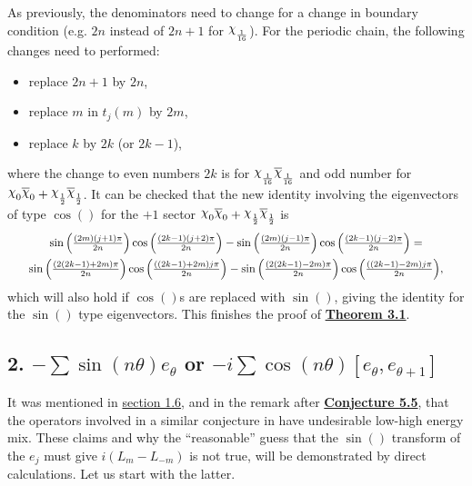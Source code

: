 \documentclass[twoside,11pt,titlepage]{amsart}
\renewcommand{\=}[1]{\stackrel{#1}{=}} %
\theoremstyle{definition}
\theoremstyle{remark}
\DeclareRobustCommand{\rchi}{{\mathpalette\irchi\relax}}
\newcommand{\irchi}[2]{\raisebox{\depth}{$#1\chi$}}
\begin{document}
As previously, the denominators need to change for a change in boundary condition (e.g. $2n$ instead of $2n+1$ for $\rchi_\frac{1}{16}$). For the periodic chain, the following changes need to performed:
\begin{itemize}
    \item replace $2n+1$ by $2n$,
    \item replace $m$ in $t_j(m)$ by $2m$,
    \item replace $k$ by $2k$ (or $2k-1$),  
\end{itemize}
where the change to even numbers $2k$ is for $\rchi_{\frac{1}{16}}\overline{\rchi}_{\frac{1}{16}}$ and odd number for $\rchi_0\overline{\rchi}_0+\rchi_{\frac{1}{2}}\overline{\rchi}_{\frac{1}{2}}$. It can be checked that the new identity involving the eigenvectors of type $\cos()$ for the $+1$ sector $\rchi_0\overline{\rchi}_0+\rchi_{\frac{1}{2}}\overline{\rchi}_{\frac{1}{2}}$ is
\begin{gather*}
\scalebox{0.9}{$\sin\Big(\frac{(2m)(j+1)\pi}{2n}\Big)\cos \Big(\frac{(2k-1)(j+2)\pi}{2n}\Big)-\sin\Big(\frac{(2m)(j-1)\pi}{2n}\Big)\cos \Big(\frac{(2k-1)(j-2)\pi}{2n} \Big)= $}\\
\scalebox{0.9}{$\sin \Big(\frac{(2(2k-1)+2m)\pi}{2n}\Big)\cos \Big(\frac{((2k-1)+2m)j\pi}{2n} \Big)-\sin \Big(\frac{(2(2k-1)-2m)\pi}{2n}\Big)\cos \Big(\frac{((2k-1)-2m)j\pi}{2n} \Big),$}
\end{gather*}
which will also hold if $\cos()$s are replaced with $\sin()$, giving the identity for the $\sin()$ type eigenvectors. This finishes the proof of \hyperref[thm3.1]{\textbf{Theorem 3.1}}.
\hfill \break
\subsection*{2.\texorpdfstring{ 
$-\sum \sin(n\theta) e_\theta$}{TEXT} or \texorpdfstring{$-i\sum \cos(n\theta) [e_\theta,e_{\theta+1}]$}{TEXT}}\label{A.2}

\hfill \break
It was mentioned in \hyperref[1.6]{section 1.6}, and in the remark after \hyperref[cnj5.5]{\textbf{Conjecture 5.5}}, that the operators involved in a similar conjecture in \cite[(7.5)]{koo1994representations} have undesirable low-high energy mix. These claims and why the ``reasonable'' guess that the $\sin()$ transform of the $e_j$ must give $i(L_m-L_{-m})$ is not true, will be demonstrated by direct calculations. Let us start with the latter.
\end{document}
